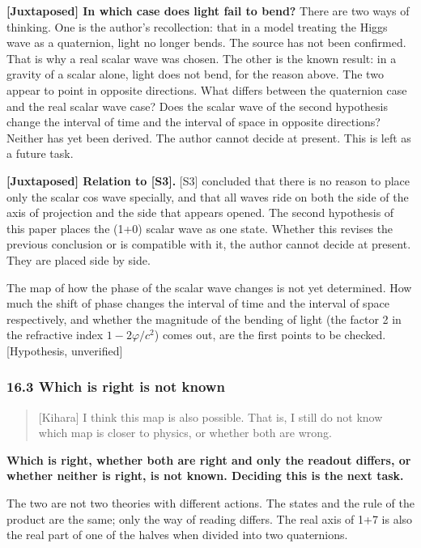 \documentclass[
  a4paper,
]{article}
\begin{document}
\textbf{{[}Juxtaposed{]} In which case does light fail to bend?} There
are two ways of thinking. One is the author's recollection: that in a
model treating the Higgs wave as a quaternion, light no longer bends.
The source has not been confirmed. That is why a real scalar wave was
chosen. The other is the known result: in a gravity of a scalar alone,
light does not bend, for the reason above. The two appear to point in
opposite directions. What differs between the quaternion case and the
real scalar wave case? Does the scalar wave of the second hypothesis
change the interval of time and the interval of space in opposite
directions? Neither has yet been derived. The author cannot decide at
present. This is left as a future task.

\textbf{{[}Juxtaposed{]} Relation to {[}S3{]}.} {[}S3{]} concluded that
there is no reason to place only the scalar cos wave specially, and that
all waves ride on both the side of the axis of projection and the side
that appears opened. The second hypothesis of this paper places the
(1+0) scalar wave as one state. Whether this revises the previous
conclusion or is compatible with it, the author cannot decide at
present. They are placed side by side.

The map of how the phase of the scalar wave changes is not yet
determined. How much the shift of phase changes the interval of time and
the interval of space respectively, and whether the magnitude of the
bending of light (the factor 2 in the refractive index
\(1 - 2\varphi/c^2\)) comes out, are the first points to be checked.
{[}Hypothesis, unverified{]}

\subsubsection{16.3 Which is right is not
known}\label{which-is-right-is-not-known}

\begin{quote}
{[}Kihara{]} I think this map is also possible. That is, I still do not
know which map is closer to physics, or whether both are wrong.
\end{quote}

\textbf{Which is right, whether both are right and only the readout
differs, or whether neither is right, is not known. Deciding this is the
next task.}

The two are not two theories with different actions. The states and the
rule of the product are the same; only the way of reading differs. The
real axis of 1+7 is also the real part of one of the halves when divided
into two quaternions.
\end{document}
